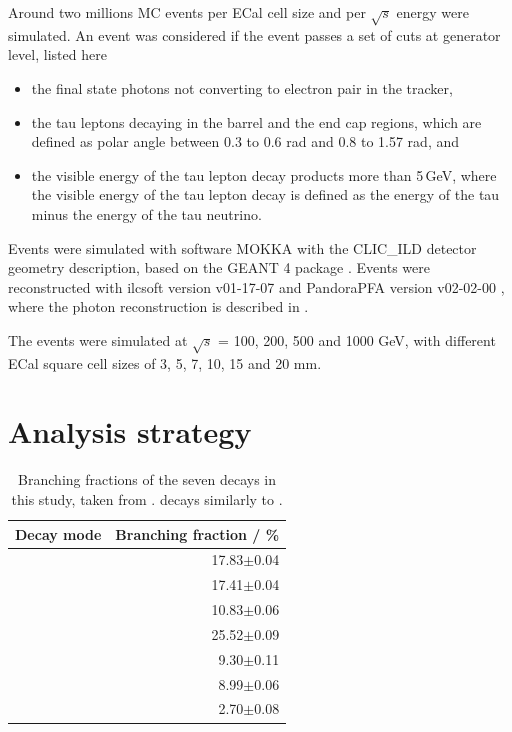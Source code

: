 \documentclass[a4paper,11pt]{article}
\newcommand{\decayElectron}{\Pem\PAGne\PGnGt}
\newcommand{\decayMuon}{\PGmm\PAGnGm\PGnGt}
\newcommand{\decayPion}{\PGpm\PGnGt}
\newcommand{\decayRho}{\PGrP{\PGpm\PGpz}\PGnGt}
\newcommand{\decayAiPhoton}{\PaDoP{\PGpm\PGpz\PGpz}\PGnGt}
\newcommand{\decayAiPion}{\PaDoP{\PGpm\PGpm\PGpp}\PGnGt}
\newcommand{\decayThreePionPhoton}{\PGpm\PGpm\PGpp\PGpz\PGnGt}
\newcommand{\rootS}{\ensuremath{\sqrt{s}} }
\begin{document}
Around two millions MC events per ECal cell size and per \rootS energy were simulated. An event was considered if the event passes a set of cuts at generator level, listed here
\begin{itemize}
  \item the final state photons not converting to electron pair in the tracker,
  \item the tau leptons decaying in the barrel and the end cap regions, which are defined as polar angle between 0.3 to 0.6 rad and 0.8 to 1.57 rad, and
  \item the visible energy of the tau lepton decay products more than 5\,GeV, where the visible energy of the tau lepton decay is defined as the energy of the tau minus the energy of the tau neutrino. 
\end{itemize}

Events were simulated with software MOKKA \cite{MoradeFreitas:2002kj} with the CLIC\_ILD detector geometry description, based on the GEANT 4 package  \cite{Agostinelli:2002hh}. Events were reconstructed with ilcsoft version v01-17-07 \cite{Gaede:82475} and PandoraPFA version v02-02-00 \cite{Marshall:2015rfa}, where the photon reconstruction is described in \cite{Xu:2016rcz}.

The events were simulated at \rootS = 100, 200, 500 and 1000 GeV, with different ECal square cell sizes of 3, 5, 7, 10, 15 and 20 mm.

\section{Analysis strategy}

\begin{table}[htbp]
\centering
\caption{\label{tab:decay_mode} Branching fractions of the seven \PGtm decays in this study, taken from \cite{Agashe:2014kda}. \PGtp decays similarly to \PGtm.}
\smallskip
\begin{tabular}{|l |r|}
\hline
  \textbf{Decay mode} & \textbf{Branching fraction / \%} \\
\hline
  \decayElectron        & 17.83$\pm$0.04   \\
  \decayMuon  	& 17.41$\pm$0.04  \\
  \decayPion     	& 10.83$\pm$0.06   \\
  \decayRho	& 25.52$\pm$0.09 \\
  \decayAiPhoton	& 9.30$\pm$0.11    \\
  \decayAiPion  	    & 8.99$\pm$0.06  \\
  \decayThreePionPhoton  	    & 2.70$\pm$0.08  \\

\hline
\end{tabular}
\end{table}
\end{document}
